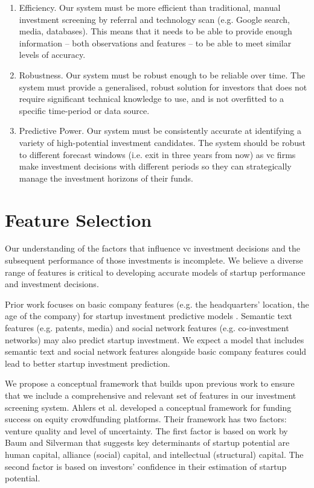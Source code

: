 \documentclass[../thesis/thesis.tex]{subfiles}
\begin{document}
\begin{enumerate}

\item Efficiency. Our system must be more efficient than traditional, manual investment screening by referral and technology scan (e.g. Google search, media, databases). This means that it needs to be able to provide enough information -- both observations and features -- to be able to meet similar levels of accuracy.

\item Robustness. Our system must be robust enough to be reliable over time. The system must provide a generalised, robust solution for investors that does not require significant technical knowledge to use, and is not overfitted to a specific time-period or data source.

\item Predictive Power. Our system must be consistently accurate at identifying a variety of high-potential investment candidates. The system should be robust to different forecast windows (i.e. exit in three years from now) as \gls{vc} firms make investment decisions with different periods so they can strategically manage the investment horizons of their funds.

\end{enumerate}

\section{Feature Selection}

Our understanding of the factors that influence \gls{vc} investment decisions and the subsequent performance of those investments is incomplete. We believe a diverse range of features is critical to developing accurate models of startup performance and investment decisions.

Prior work focuses on basic company features (e.g. the headquarters' location, the age of the company) for startup investment predictive models \cite{beckwith2016, gimmon2010}. Semantic text features (e.g. patents, media) \cite{hoenen2014, yuan2016} and social network features (e.g. co-investment networks) \cite{werth2013, cheng2016, yu2015} may also predict startup investment. We expect a model that includes semantic text and social network features alongside basic company features could lead to better startup investment prediction.

We propose a conceptual framework that builds upon previous work to ensure that we include a comprehensive and relevant set of features in our investment screening system.  Ahlers et al. \cite{ahlers2015} developed a conceptual framework for funding success on equity crowdfunding platforms. Their framework has two factors: venture quality and level of uncertainty. The first factor is based on work by Baum and Silverman \cite{baum2004} that suggests key determinants of startup potential are human capital, alliance (social) capital, and intellectual (structural) capital. The second factor is based on investors' confidence in their estimation of startup potential.
\end{document}
